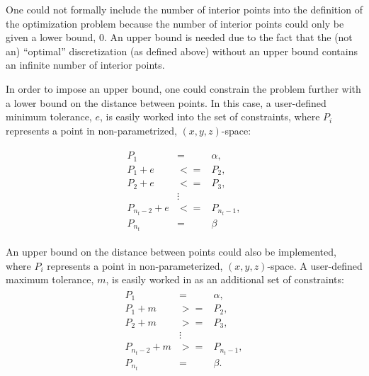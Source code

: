 One could not formally include the number of interior points into the 
definition of the optimization problem because the number of interior 
points could only be given a lower bound, 0. An upper bound is needed due 
to the fact that the (not an) ``optimal'' discretization (as defined 
above) without an upper bound contains an infinite number of interior 
points. 

In order to impose an upper bound, one could constrain the problem further 
with a lower bound on the distance between points. In this case, 
a user-defined minimum tolerance, $e$, is easily worked into the set of 
constraints, where $P_i$ represents a point in non-parametrized, $(x,y,z)$-space:

\begin{eqnarray*}
\begin{array}{rcl}
P_1 & = & \alpha,\\
P_1+e & <= & P_2, \\ 
P_2+e & <= & P_3, \\ 
& \vdots & \\
P_{n_t-2}+ e & <= & P_{n_t-1}, \\
P_{n_t} & = & \beta
\end{array}
\end{eqnarray*}

An upper bound on the distance between points could also be implemented, 
where $P_i$ represents a point in non-parameterized, $(x,y,z)$-space.
A user-defined maximum tolerance, $m$, is easily worked in as an 
additional set of constraints: 
\begin{eqnarray*}
\begin{array}{rcl}
P_1 & = & \alpha, \\ 
P_1+m & >= & P_2, \\
P_2+m & >= & P_3, \\ 
& \vdots & \\
P_{n_t-2}+ m & >= & P_{n_t-1}, \\
P_{n_t} & = & \beta.
\end{array}
\end{eqnarray*}

